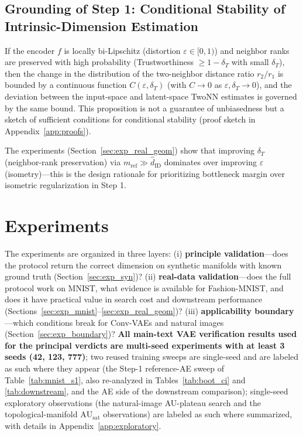 \documentclass[make,article,submit,pdftex,moreauthors]{Definitions/mdpi}
\newcommand{\hatdID}{\hat{d}_{\mathrm{ID}}}
\newcommand{\AUsat}{\mathrm{AU}_{\mathrm{sat}}}
\begin{document}
\subsection{Grounding of Step 1: Conditional Stability of Intrinsic-Dimension Estimation}\label{sec:theory_twonn}

\begin{Proposition}\label{thm:twonn_stability}
If the encoder $f$ is locally bi-Lipschitz (distortion
$\varepsilon \in [0,1)$) and neighbor ranks are preserved with high
probability (Trustworthiness $\geq 1 - \delta_T$ with small $\delta_T$),
then the change in the distribution of the two-neighbor distance ratio
$r_2/r_1$ is bounded by a continuous function $C(\varepsilon, \delta_T)$
(with $C \to 0$ as $\varepsilon, \delta_T \to 0$), and the deviation between
the input-space and latent-space TwoNN estimates is governed by the same
bound.
This proposition is not a guarantee of unbiasedness but a sketch of
sufficient conditions for conditional stability (proof sketch in
Appendix~\ref{app:proofs}).
\end{Proposition}

The experiments (Section~\ref{sec:exp_real_geom}) show that improving
$\delta_T$ (neighbor-rank preservation) via $m_{\mathrm{ref}} \gg \hatdID$
dominates over improving $\varepsilon$ (isometry)---this is the design
rationale for prioritizing bottleneck margin over isometric regularization
in Step 1.

\section{Experiments}\label{sec:exp}

The experiments are organized in three layers:
(i) \textbf{principle validation}---does the protocol return the correct
dimension on synthetic manifolds with known ground truth
(Section~\ref{sec:exp_syn})?
(ii) \textbf{real-data validation}---does the full protocol work on MNIST,
what evidence is available for Fashion-MNIST, and does it have practical
value in search cost and downstream performance
(Sections~\ref{sec:exp_mnist}--\ref{sec:exp_real_geom})?
(iii) \textbf{applicability boundary}---which conditions break for
Conv-VAEs and natural images (Section~\ref{sec:exp_boundary})?
\textbf{All main-text VAE verification results used for the principal
verdicts are multi-seed experiments with at least 3 seeds (42, 123, 777)};
two reused training sweeps are single-seed and are labeled as such where
they appear (the Step-1 reference-AE sweep of Table~\ref{tab:mnist_s1},
also re-analyzed in Tables~\ref{tab:boot_ci} and \ref{tab:downstream}, and
the AE side of the downstream comparison); single-seed exploratory
observations (the natural-image AU-plateau search and the
topological-manifold $\AUsat$ observations) are labeled as such where
summarized, with details in Appendix~\ref{app:exploratory}.
\end{document}
